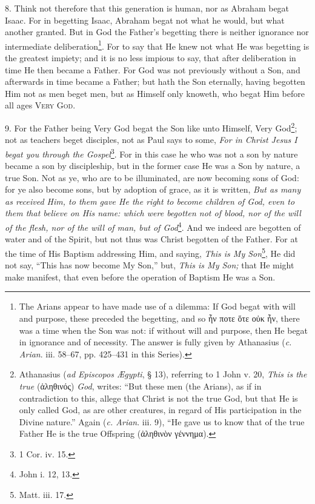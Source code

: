 8. Think not therefore that this generation is human, nor as Abraham begat Isaac. For in begetting Isaac, Abraham begat not what he would, but what another granted. But in God the Father’s begetting there is neither ignorance nor intermediate deliberation\footnote{The Arians appear to have made use of a dilemma: If God begat with will and purpose, these preceded the begetting, and so \textgreek{ἦν ποτε ὅτε οὐκ ἦν}, there was a time when the Son was not: if without will and purpose, then He begat in ignorance and of necessity. The answer is fully given by Athanasius (\emph{c. Arian}. iii. 58–67, pp. 425–431 in this Series).}. For to say that He knew not what He was begetting is the greatest impiety; and it is no less impious to say, that after deliberation in time He then became a Father. For God was not previously without a Son, and afterwards in time became a Father; but hath the Son eternally, having begotten Him not as men beget men, but as Himself only knoweth, who begat Him before all ages \textsc{Very God}.

9. For the Father being Very God begat the Son like unto Himself, Very God\footnote{Athanasius (\emph{ad Episcopos Ægypti}, § 13), referring to 1 John v. 20, \emph{This is the true} (\textgreek{ἁληθινός}) \emph{God}, writes: “But these men (the Arians), as if in contradiction to this, allege that Christ is not the true God, but that He is only called God, as are other creatures, in regard of His participation in the Divine nature.” Again (\emph{c. Arian}. iii. 9), “He gave us to know that of the true Father He is the true Offspring (\textgreek{ἀληθινὸν γέννημα}).}; not as teachers beget disciples, not as Paul says to some, \emph{For in Christ Jesus I begat you through the Gospel}\footnote{1 Cor. iv. 15.}. For in this case he who was not a son by nature became a son by discipleship, but in the former case He was a Son by nature, a true Son. Not as ye, who are to be illuminated, are now becoming sons of God: for ye also become sons, but by adoption of grace, as it is written, \emph{But as many as received Him, to them gave He the right to become children of God, even to them that believe on His name: which were begotten not of blood, nor of the will of the flesh, nor of the will of man, but of God}\footnote{John i. 12, 13.}. And we indeed are begotten of water and of the Spirit, but not thus was Christ begotten of the Father. For at the time of His Baptism addressing Him, and saying, \emph{This is My Son}\footnote{Matt. iii. 17.}, He did not say, “This has now become My Son,” but, \emph{This is My Son;} that He might make manifest, that even before the operation of Baptism He was a Son.

